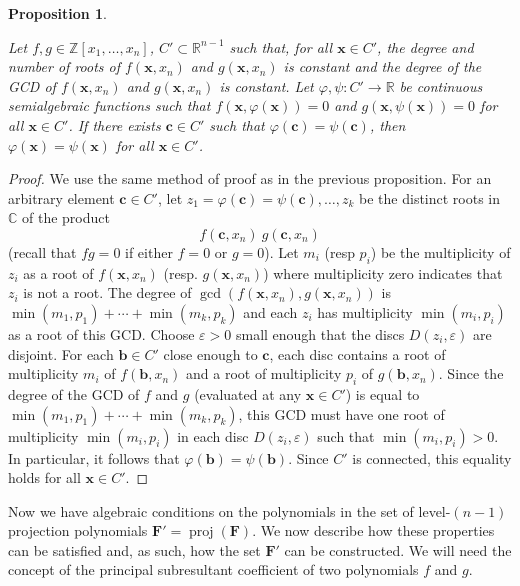 \documentclass[
]{book}
\newtheorem{proposition}{Proposition}[chapter]
\theoremstyle{definition}
\theoremstyle{definition}
\theoremstyle{definition}
\theoremstyle{definition}
\theoremstyle{remark}
\begin{document}
\begin{proposition}
\citep[Proposition 2.18]{coste2000}

Let \(f,g \in \mathbb{Z}[x_1,\ldots,x_n]\), \(C' \subset \mathbb{R}^{n-1}\) such that, for all \(\mathbf{x} \in C'\), the degree and number of roots of \(f(\mathbf{x},x_n)\) and \(g(\mathbf{x},x_n)\) is constant and the degree of the GCD of \(f(\mathbf{x},x_n)\) and \(g(\mathbf{x},x_n)\) is constant.
Let \(\varphi,\psi : C' \to \mathbb{R}\) be continuous semialgebraic functions such that \(f(\mathbf{x},\varphi(\mathbf{x})) = 0\) and \(g(\mathbf{x},\psi(\mathbf{x})) = 0\) for all \(\mathbf{x} \in C'\).
If there exists \(\mathbf{c} \in C'\) such that \(\varphi(\mathbf{c}) = \psi(\mathbf{c})\), then \(\varphi(\mathbf{x}) = \psi(\mathbf{x})\) for all \(\mathbf{x} \in C'\).
\end{proposition}

\begin{proof}
We use the same method of proof as in the previous proposition.
For an arbitrary element \(\mathbf{c} \in C'\), let \(z_1 = \varphi(\mathbf{c}) = \psi(\mathbf{c}), \ldots, z_k\) be the distinct roots in \(\mathbb{C}\) of the product
\[
f(\mathbf{c},x_n)\ g(\mathbf{c},x_n)
\]
(recall that \(fg = 0\) if either \(f=0\) or \(g=0\)).
Let \(m_i\) (resp \(p_i\)) be the multiplicity of \(z_i\) as a root of \(f(\mathbf{x},x_n)\) (resp. \(g(\mathbf{x}, x_n)\)) where multiplicity zero indicates that \(z_i\) is not a root.
The degree of \(\gcd(f(\mathbf{x}, x_n), g(\mathbf{x}, x_n))\) is \(\min(m_1,p_1) + \cdots + \min(m_k,p_k)\) and each \(z_i\) has multiplicity \(\min(m_i,p_i)\) as a root of this GCD.
Choose \(\varepsilon > 0\) small enough that the discs \(D(z_i,\varepsilon)\) are disjoint.
For each \(\mathbf{b} \in C'\) close enough to \(\mathbf{c}\), each disc contains a root of multiplicity \(m_i\) of \(f(\mathbf{b}, x_n)\) and a root of multiplicity \(p_i\) of \(g(\mathbf{b}, x_n)\). Since the degree of the GCD of \(f\) and \(g\) (evaluated at any \(\mathbf{x} \in C'\)) is equal to \(\min(m_1,p_1) + \cdots + \min(m_k,p_k)\), this GCD must have one root of multiplicity \(\min(m_i,p_i)\) in each disc \(D(z_i,\varepsilon)\) such that \(\min(m_i,p_i) > 0\).
In particular, it follows that \(\varphi(\mathbf{b}) = \psi(\mathbf{b})\). Since \(C'\) is connected, this equality holds for all \(\mathbf{x} \in C'\).
\end{proof}

Now we have algebraic conditions on the polynomials in the set of level-\((n-1)\) projection polynomials \(\mathbf{F}' = \operatorname{proj}(\mathbf{F})\). We now describe how these properties can be satisfied and, as such, how the set \(\mathbf{F}'\) can be constructed. We will need the concept of the principal subresultant coefficient of two polynomials \(f\) and \(g\).
\end{document}
